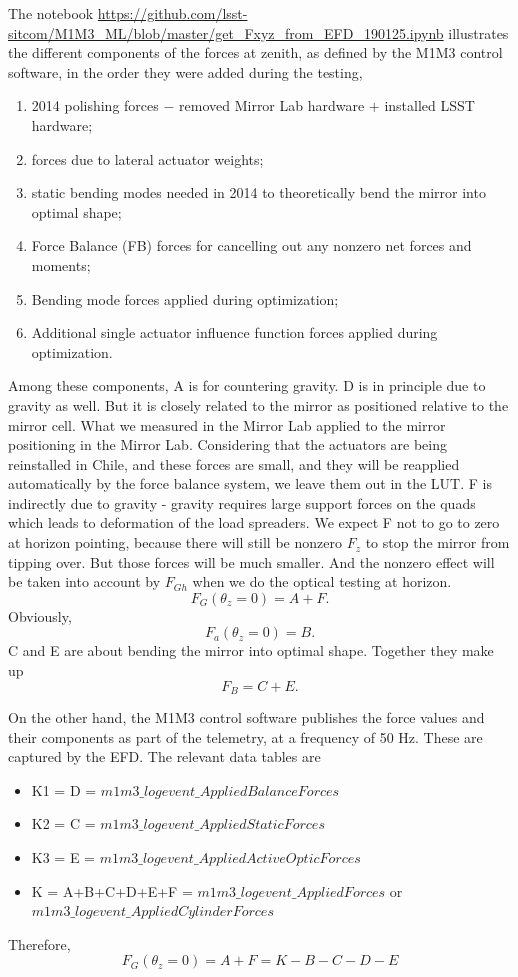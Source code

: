 \documentclass [twoside,openbib,12pt]{article}
\newcommand{\beq}{\begin{equation}}
\newcommand{\eeq}{\end{equation}}
\newcommand{\bitm}{\begin{itemize}}
\newcommand{\eitm}{\end{itemize}}
\newcommand{\bnum}{\begin{enumerate}}
\newcommand{\enum}{\end{enumerate}}
\begin{document}
The notebook
\url{https://github.com/lsst-sitcom/M1M3_ML/blob/master/get_Fxyz_from_EFD_190125.ipynb}
illustrates the different components of the forces at zenith, as
defined by the M1M3 control software, in the order they were added
during the testing,

\bnum [label=\Alph*]
\item 2014 polishing forces $-$ removed Mirror Lab hardware $+$
  installed LSST hardware;
\item forces due to lateral actuator weights;
  \item static bending modes needed in 2014 to theoretically bend
    the mirror into optimal shape;
    \item Force Balance (FB) forces for cancelling out any nonzero net
      forces and moments;
    \item Bending mode forces applied during optimization;
      \item Additional single actuator influence function forces applied during optimization.
\enum
Among these components, A is for countering gravity.
D is in principle due to gravity as well. But it is closely related
to the mirror as positioned relative to the mirror cell.
What we measured in the Mirror Lab
applied to the mirror positioning in the Mirror Lab. Considering that the
actuators are being reinstalled in Chile, and these forces are small,
and they will be reapplied automatically by the force balance system,
we leave them out in the LUT.
F is indirectly due to gravity - gravity requires large support forces
on the quads which leads to deformation of the load spreaders.
We expect F not to go to zero at horizon pointing, because there will
still be nonzero $F_z$ to stop the mirror from tipping over. But those
forces will be much smaller. And the nonzero effect will be taken into
account by $F_{Gh}$ when we do the optical testing at horizon.
\beq
F_G(\theta_z=0) = A+F.
\eeq
Obviously,
\beq
F_a(\theta_z=0) = B.
\eeq
C and E are about bending the mirror into optimal shape. Together
they make up
\beq
F_B = C+E.
\eeq

On the other hand, the M1M3 control software publishes the force
values and their components as part of the telemetry, at a frequency
of 50 Hz. These are captured by the
EFD.
The relevant data tables are
\bitm
\item K1 = D = $m1m3\_logevent\_AppliedBalanceForces$
\item K2 = C = $m1m3\_logevent\_AppliedStaticForces$
\item K3 = E = $m1m3\_logevent\_AppliedActiveOpticForces$
\item K = A+B+C+D+E+F = $m1m3\_logevent\_AppliedForces$  or \\$m1m3\_logevent\_AppliedCylinderForces$
  \eitm
  Therefore,
  \beq
  F_G(\theta_z=0) = A+F = K-B-C-D-E
  \eeq
\end{document}
